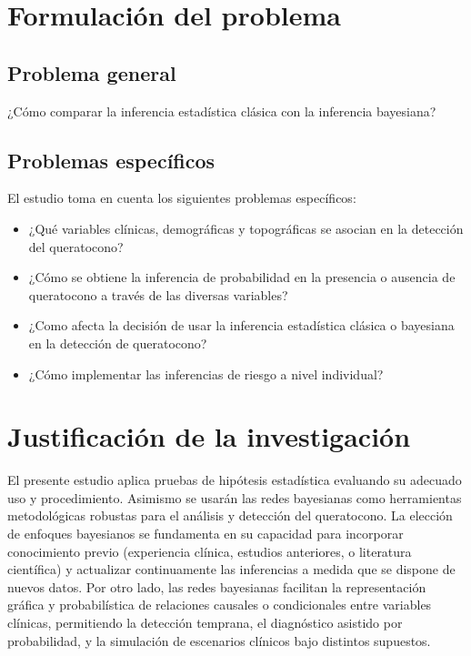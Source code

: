 \section{Formulación del problema}
\subsection{Problema general}
¿Cómo comparar la inferencia estadística clásica con la inferencia bayesiana?

\subsection{Problemas específicos}
El estudio toma en cuenta los siguientes problemas específicos:

\begin{itemize}
	\item ¿Qué variables clínicas, demográficas y topográficas se asocian en la detección del queratocono?
	\item ¿Cómo se obtiene la inferencia de probabilidad en la presencia o ausencia de queratocono a través de las diversas variables?
	\item ¿Como afecta la decisión de usar la inferencia estadística clásica o bayesiana en la detección de queratocono?
	\item ¿Cómo implementar las inferencias de riesgo a nivel individual?
\end{itemize}

\section{Justificación de la investigación}
El presente estudio aplica pruebas de hipótesis estadística evaluando su adecuado uso y procedimiento. Asimismo se usarán las redes bayesianas como herramientas metodológicas robustas para el análisis y detección del queratocono. La elección de enfoques bayesianos se fundamenta en su capacidad para incorporar conocimiento previo (experiencia clínica, estudios anteriores, o literatura científica) y actualizar continuamente las inferencias a medida que se dispone de nuevos datos. Por otro lado, las redes bayesianas facilitan la representación gráfica y probabilística de relaciones causales o condicionales entre variables clínicas, permitiendo la detección temprana, el diagnóstico asistido por probabilidad, y la simulación de escenarios clínicos bajo distintos supuestos.

